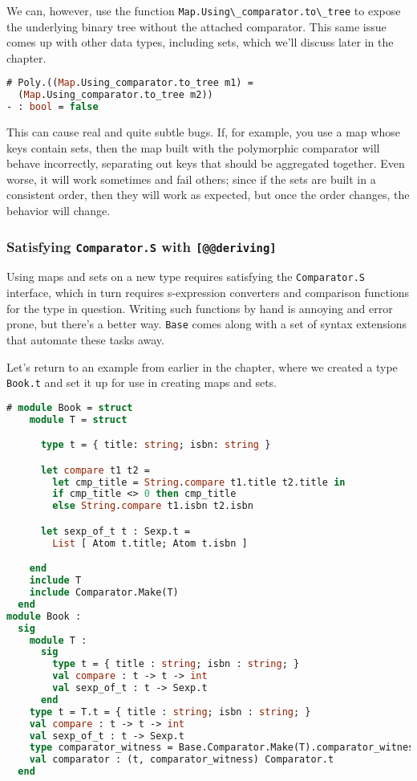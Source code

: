 We can, however, use the function
\passthrough{\lstinline!Map.Using\_comparator.to\_tree!} to expose the
underlying binary tree without the attached comparator. This same issue
comes up with other data types, including sets, which we'll discuss
later in the chapter.

\begin{lstlisting}[language=Caml]
# Poly.((Map.Using_comparator.to_tree m1) =
  (Map.Using_comparator.to_tree m2))
- : bool = false
\end{lstlisting}

This can cause real and quite subtle bugs. If, for example, you use a
map whose keys contain sets, then the map built with the polymorphic
comparator will behave incorrectly, separating out keys that should be
aggregated together. Even worse, it will work sometimes and fail others;
since if the sets are built in a consistent order, then they will work
as expected, but once the order changes, the behavior will change.

\hypertarget{satsifying-comparator.s-with-deriving}{%
\subsubsection{\texorpdfstring{Satisfying \texttt{Comparator.S} with
\texttt{{[}@@deriving{]}}}{Satisfying Comparator.S with {[}@@deriving{]}}}\label{satsifying-comparator.s-with-deriving}}

Using maps and sets on a new type requires satisfying the
\passthrough{\lstinline!Comparator.S!} interface, which in turn requires
s-expression converters and comparison functions for the type in
question. Writing such functions by hand is annoying and error prone,
but there's a better way. \passthrough{\lstinline!Base!} comes along
with a set of syntax extensions that automate these tasks away.

Let's return to an example from earlier in the chapter, where we created
a type \passthrough{\lstinline!Book.t!} and set it up for use in
creating maps and sets.

\begin{lstlisting}[language=Caml]
# module Book = struct
    module T = struct

      type t = { title: string; isbn: string }

      let compare t1 t2 =
        let cmp_title = String.compare t1.title t2.title in
        if cmp_title <> 0 then cmp_title
        else String.compare t1.isbn t2.isbn

      let sexp_of_t t : Sexp.t =
        List [ Atom t.title; Atom t.isbn ]

    end
    include T
    include Comparator.Make(T)
  end
module Book :
  sig
    module T :
      sig
        type t = { title : string; isbn : string; }
        val compare : t -> t -> int
        val sexp_of_t : t -> Sexp.t
      end
    type t = T.t = { title : string; isbn : string; }
    val compare : t -> t -> int
    val sexp_of_t : t -> Sexp.t
    type comparator_witness = Base.Comparator.Make(T).comparator_witness
    val comparator : (t, comparator_witness) Comparator.t
  end
\end{lstlisting}

